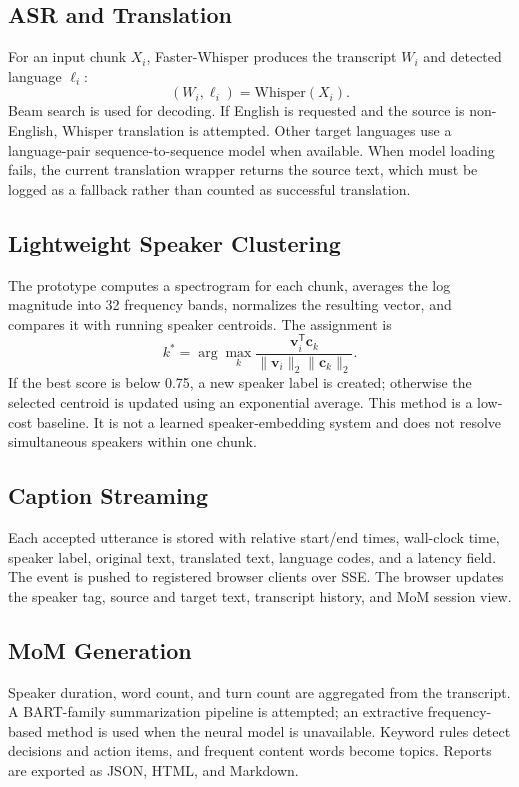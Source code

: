 \documentclass[conference]{IEEEtran}
\begin{document}
\subsection{ASR and Translation}
For an input chunk $X_i$, Faster-Whisper produces the transcript $W_i$ and detected language $\ell_i$:
\begin{equation}
(W_i,\ell_i)=\mathrm{Whisper}(X_i).
\end{equation}
Beam search is used for decoding. If English is requested and the source is non-English, Whisper translation is attempted. Other target languages use a language-pair sequence-to-sequence model when available. When model loading fails, the current translation wrapper returns the source text, which must be logged as a fallback rather than counted as successful translation.

\subsection{Lightweight Speaker Clustering}
The prototype computes a spectrogram for each chunk, averages the log magnitude into 32 frequency bands, normalizes the resulting vector, and compares it with running speaker centroids. The assignment is
\begin{equation}
k^*=\arg\max_k \frac{\mathbf{v}_i^{\mathsf T}\mathbf{c}_k}
{\lVert\mathbf{v}_i\rVert_2\lVert\mathbf{c}_k\rVert_2}.
\end{equation}
If the best score is below 0.75, a new speaker label is created; otherwise the selected centroid is updated using an exponential average. This method is a low-cost baseline. It is not a learned speaker-embedding system and does not resolve simultaneous speakers within one chunk.

\subsection{Caption Streaming}
Each accepted utterance is stored with relative start/end times, wall-clock time, speaker label, original text, translated text, language codes, and a latency field. The event is pushed to registered browser clients over SSE. The browser updates the speaker tag, source and target text, transcript history, and MoM session view.

\subsection{MoM Generation}
Speaker duration, word count, and turn count are aggregated from the transcript. A BART-family summarization pipeline is attempted; an extractive frequency-based method is used when the neural model is unavailable. Keyword rules detect decisions and action items, and frequent content words become topics. Reports are exported as JSON, HTML, and Markdown.
\end{document}
